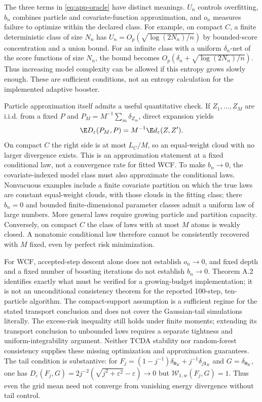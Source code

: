 The three terms in \eqref{eq:app-oracle} have distinct meanings. $U_n$ controls overfitting, $b_n$ combines particle and covariate-function approximation, and $o_n$ measures failure to optimize within the declared class. For example, on compact $C$, a finite deterministic class of size $N_n$ has $U_n=O_p(\sqrt{\log(2N_n)/n})$ by bounded-score concentration and a union bound. For an infinite class with a uniform $\delta_n$-net of the score functions of size $N_n$, the bound becomes $O_p(\delta_n+\sqrt{\log(2N_n)/n})$. Thus increasing model complexity can be allowed if this entropy grows slowly enough. These are sufficient conditions, not an entropy calculation for the implemented adaptive booster.

Particle approximation itself admits a useful quantitative check. If $Z_1,\ldots,Z_M$ are i.i.d. from a fixed $P$ and $P_M=M^{-1}\sum_m\delta_{Z_m}$, direct expansion yields
\begin{equation}
 \E D_\varepsilon(P_M,P)=M^{-1}\E d_\varepsilon(Z,Z').
 \label{eq:app-particle-rate}
\end{equation}
On compact $C$ the right side is at most $L_C/M$, so an equal-weight cloud with no larger divergence exists. This is an approximation statement at a fixed conditional law, not a convergence rate for fitted WCF. To make $b_n\to0$, the covariate-indexed model class must also approximate the conditional laws. Nonvacuous examples include a finite covariate partition on which the true laws are constant equal-weight clouds, with those clouds in the fitting class; there $b_n=0$ and bounded finite-dimensional parameter classes admit a uniform law of large numbers. More general laws require growing particle and partition capacity. Conversely, on compact $C$ the class of laws with at most $M$ atoms is weakly closed. A nonatomic conditional law therefore cannot be consistently recovered with $M$ fixed, even by perfect risk minimization.

For WCF, accepted-step descent alone does not establish $o_n\to0$, and fixed depth and a fixed number of boosting iterations do not establish $b_n\to0$. Theorem A.2 identifies exactly what must be verified for a growing-budget implementation; it is not an unconditional consistency theorem for the reported 100-step, ten-particle algorithm. The compact-support assumption is a sufficient regime for the stated transport conclusion and does not cover the Gaussian-tail simulations literally. The excess-risk inequality still holds under finite moments; extending its transport conclusion to unbounded laws requires a separate tightness and uniform-integrability argument. Neither TCDA stability nor random-forest consistency supplies these missing optimization and approximation guarantees. The tail condition is substantive: for $F_j=(1-j^{-1})\delta_{\mathbf0_K}+j^{-1}\delta_{j\mathbf1_K}$ and $G=\delta_{\mathbf0_K}$, one has $D_\varepsilon(F_j,G)=2j^{-2}(\sqrt{j^2+\varepsilon^2}-\varepsilon)\to0$ but $\mathcal W_{1,w}(F_j,G)=1$. Thus even the grid mean need not converge from vanishing energy divergence without tail control.

